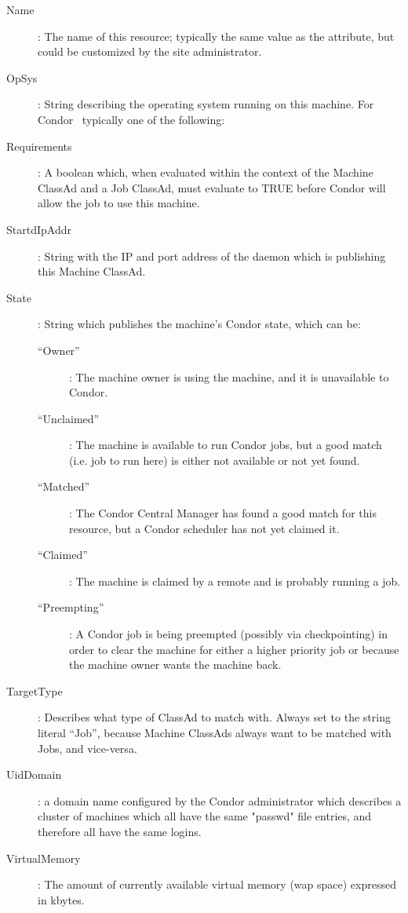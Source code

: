 \begin{description}
%
\item[Name] : The name of this resource; typically the same value as
the  attribute, but could be customized by the site administrator.
%
\item[OpSys] : String describing the operating system running on this
machine.  For Condor \VersionNotice\ typically one of the following:
%
\item[Requirements] : A boolean which, when evaluated within the context
of the Machine ClassAd and a Job ClassAd, must evaluate to
TRUE before Condor will allow the job to use this machine.
%
\item[StartdIpAddr] : String with the IP and port address of the
 daemon which is publishing this Machine ClassAd.
%
\item[State] : String which publishes the machine's Condor state, which
can be:
	\begin{description}
	\item[``Owner''] : The machine owner is using the machine, and
it is unavailable to Condor.
	\item[``Unclaimed''] : The machine is available to run Condor jobs,
but a good match (i.e. job to run here) is either not available or not 
yet found.
	\item[``Matched''] : The Condor Central Manager has found a good
match for this resource, but a Condor scheduler has not yet claimed it.
	\item[``Claimed''] : The machine is claimed by a remote
 and is probably running a job.
	\item[``Preempting''] : A Condor job is being preempted (possibly
via checkpointing) in order to clear the machine for either a higher
priority job or because the machine owner wants the machine back.
	\end{description}   %
%
\item[TargetType] : Describes what type of ClassAd to match with.
Always set to the string literal ``Job'', because Machine ClassAds
always want to be matched with Jobs, and vice-versa.
%
\item[UidDomain] : a domain name configured by the Condor 
administrator which describes a cluster of machines which all have 
the same "passwd" file entries, and therefore all have the same logins.
%
\item[VirtualMemory] : The amount of currently available virtual memory 
(wap space) expressed in kbytes.

\end{description}
